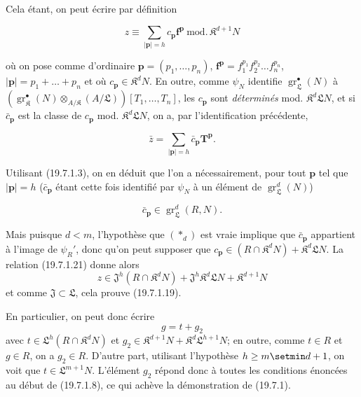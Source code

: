 Cela étant, on peut écrire par définition
\begin{env}[19.7.1.21]
\label{IV.19.7.1.21}
\[
  z\equiv\sum_{|\mathbf p|=h}c_{\mathbf p}\mathbf f^{\mathbf p}\ \mathrm{mod.}\,\mathfrak K^{d+1}N
\]
\end{env}
où on pose comme d'ordinaire $\mathbf p=(p_1,\ldots,p_n)$, $\mathbf f^{\mathbf p}=f_1^{p_1}f_2^{p_2}\ldots f_n^{p_n}$, $|\mathbf p|=p_1+\ldots+p_n$ et où $c_{\mathbf p}\in\mathfrak K^dN$. En outre, comme $\psi_N$ identifie $\operatorname{gr}_{\mathfrak L}^\bullet(N)$ à $(\operatorname{gr}_{\mathfrak K}^\bullet(N)\otimes_{A/\mathfrak K}(A/\mathfrak L))[T_1,\ldots,T_n]$, les $c_{\mathbf p}$ sont \emph{déterminés} mod. $\mathfrak K^d\mathfrak LN$, et si $\bar c_{\mathbf p}$ est la classe de $c_{\mathbf p}$ mod. $\mathfrak K^d\mathfrak LN$, on a, par l'identification précédente,
\begin{env}[19.7.1.22]
\label{IV.19.7.1.22}
\[
  \bar z=\sum_{|\mathbf p|=h}\bar c_{\mathbf p}\mathbf T^{\mathbf p}.
\]
\end{env}
Utilisant (19.7.1.3), on en déduit que l'on a nécessairement, pour tout $\mathbf p$ tel que $|\mathbf p|=h$ ($\bar c_{\mathbf p}$ étant cette fois identifié par $\psi_N$ à un élément de $\operatorname{gr}_{\mathfrak L}^d(N)$)
\begin{env}[19.7.1.23]
\label{IV.19.7.1.23}
\[
  \bar c_{\mathbf p}\in\operatorname{gr}_{\mathfrak L}^d(R,N).
\]
\end{env}
Mais puisque $d<m$, l'hypothèse que $(*_d)$ est vraie implique que $\bar c_{\mathbf p}$ appartient à l'image de $\psi_R'$, donc qu'on peut supposer que $c_{\mathbf p}\in(R\cap\mathfrak K^dN)+\mathfrak K^d\mathfrak LN$. La relation (19.7.1.21) donne alors
\[
  z\in\mathfrak J^h(R\cap\mathfrak K^dN)+\mathfrak J^h\mathfrak K^d\mathfrak LN+\mathfrak K^{d+1}N
\]
et comme $\mathfrak J\subset\mathfrak L$, cela prouve (19.7.1.19).


En particulier, on peut donc écrire
\[
  g=t+g_2
\]
avec $t\in\mathfrak L^h(R\cap\mathfrak K^dN)$ et $g_2\in\mathfrak K^{d+1}N+\mathfrak K^d\mathfrak L^{h+1}N$; en outre, comme $t\in R$ et $g\in R$, on a $g_2\in R$. D'autre part, utilisant l'hypothèse $h\geq m\setmin d+1$, on voit que $t\in\mathfrak L^{m+1}N$. L'élément $g_2$ répond donc à toutes les conditions énoncées au début de (19.7.1.8), ce qui achève la démonstration de (19.7.1).

